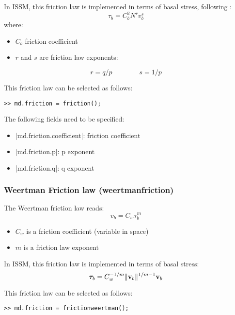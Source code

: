 In ISSM, this friction law is implemented in terms of basal stress, following \cite{Budd1979}:
\begin{equation}
	\tau_b = C_b^2 N^r {v}_b^s
\end{equation}
where:
\begin{itemize}
	\item $C_b$ friction coefficient
	\item $r$ and $s$ are friction law exponents:
\end{itemize}
\begin{equation}
	r=q/p \hspace{4em} s=1/p
\end{equation}

This friction law can be selected as follows:
\begin{lstlisting}
>> md.friction = friction();
\end{lstlisting}

The following fields need to be specified:
\begin{itemize}
	\item \lstinlinebg|md.friction.coefficient|: friction coefficient
	\item \lstinlinebg|md.friction.p|: p exponent
	\item \lstinlinebg|md.friction.q|: q exponent
\end{itemize}

\subsubsection{Weertman Friction law (weertmanfriction)}
The Weertman friction \citep{Weertman1957} law reads:
\begin{equation}
	v_b  = C_w {\tau}_b^m
\end{equation}
\begin{itemize}
	\item $C_w$ is a friction coefficient (variable in space)
	\item $m$ is a friction law exponent
\end{itemize}

In ISSM, this friction law is implemented in terms of basal stress:
\begin{equation}
	\boldsymbol{\tau}_b = C_w^{-1/m} \|{\bf v}_b\|^{1/m-1} {\bf v}_b
\end{equation}

This friction law can be selected as follows:
\begin{lstlisting}
>> md.friction = frictionweertman();
\end{lstlisting}

